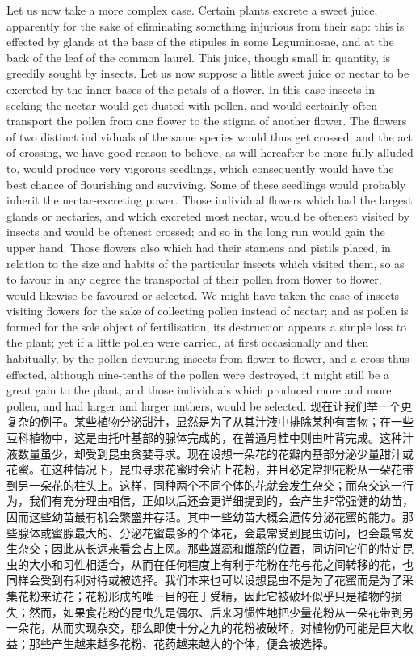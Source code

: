 \darwinpair
{Let us now take a more complex case. Certain plants excrete a sweet juice, apparently for the sake of eliminating something injurious from their sap: this is effected by glands at the base of the stipules in some Leguminosae, and at the back of the leaf of the common laurel. This juice, though small in quantity, is greedily sought by insects. Let us now suppose a little sweet juice or nectar to be excreted by the inner bases of the petals of a flower. In this case insects in seeking the nectar would get dusted with pollen, and would certainly often transport the pollen from one flower to the stigma of another flower. The flowers of two distinct individuals of the same species would thus get crossed; and the act of crossing, we have good reason to believe, as will hereafter be more fully alluded to, would produce very vigorous seedlings, which consequently would have the best chance of flourishing and surviving. Some of these seedlings would probably inherit the nectar-excreting power. Those individual flowers which had the largest glands or nectaries, and which excreted most nectar, would be oftenest visited by insects and would be oftenest crossed; and so in the long run would gain the upper hand. Those flowers also which had their stamens and pistils placed, in relation to the size and habits of the particular insects which visited them, so as to favour in any degree the transportal of their pollen from flower to flower, would likewise be favoured or selected. We might have taken the case of insects visiting flowers for the sake of collecting pollen instead of nectar; and as pollen is formed for the sole object of fertilisation, its destruction appears a simple loss to the plant; yet if a little pollen were carried, at first occasionally and then habitually, by the pollen-devouring insects from flower to flower, and a cross thus effected, although nine-tenths of the pollen were destroyed, it might still be a great gain to the plant; and those individuals which produced more and more pollen, and had larger and larger anthers, would be selected.}
{现在让我们举一个更复杂的例子。某些植物分泌甜汁，显然是为了从其汁液中排除某种有害物；在一些豆科植物中，这是由托叶基部的腺体完成的，在普通月桂中则由叶背完成。这种汁液数量虽少，却受到昆虫贪婪寻求。现在设想一朵花的花瓣内基部分泌少量甜汁或花蜜。在这种情况下，昆虫寻求花蜜时会沾上花粉，并且必定常把花粉从一朵花带到另一朵花的柱头上。这样，同种两个不同个体的花就会发生杂交；而杂交这一行为，我们有充分理由相信，正如以后还会更详细提到的，会产生非常强健的幼苗，因而这些幼苗最有机会繁盛并存活。其中一些幼苗大概会遗传分泌花蜜的能力。那些腺体或蜜腺最大的、分泌花蜜最多的个体花，会最常受到昆虫访问，也会最常发生杂交；因此从长远来看会占上风。那些雄蕊和雌蕊的位置，同访问它们的特定昆虫的大小和习性相适合，从而在任何程度上有利于花粉在花与花之间转移的花，也同样会受到有利对待或被选择。我们本来也可以设想昆虫不是为了花蜜而是为了采集花粉来访花；花粉形成的唯一目的在于受精，因此它被破坏似乎只是植物的损失；然而，如果食花粉的昆虫先是偶尔、后来习惯性地把少量花粉从一朵花带到另一朵花，从而实现杂交，那么即使十分之九的花粉被破坏，对植物仍可能是巨大收益；那些产生越来越多花粉、花药越来越大的个体，便会被选择。}

